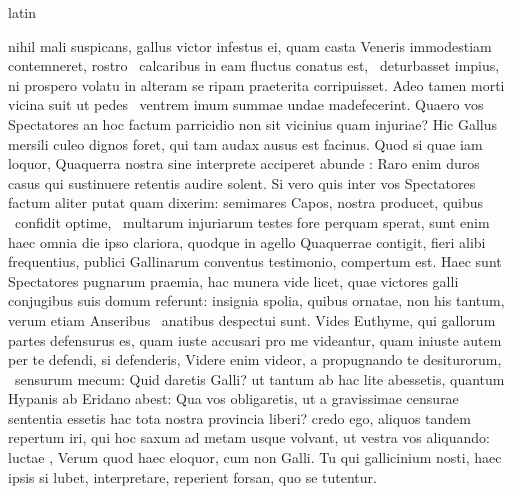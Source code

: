 \documentclass[12pt]{book}
\renewenvironment{latin}
    	{\begin{hyphenrules}{latin}}
    	{\end{hyphenrules}}
\begin{document}
\begin{pages}
\begin{latin}
\begin{Leftside}
                    nihil mali suspicans, gallus victor infestus ei, quam casta Veneris immodestiam contemneret, rostro  \ampersand\ calcaribus in  eam fluctus  conatus est,  \ampersand\ deturbasset impius, 
                    ni prospero volatu in alteram se ripam praeterita corripuisset. 
                    Adeo tamen morti vicina suit ut pedes  \ampersand\ ventrem imum summae undae madefecerint. 
                    Quaero vos Spectatores an hoc factum parricidio non sit vicinius quam injuriae? 
                    Hic Gallus mersili culeo dignos foret, qui tam audax ausus est facinus. 
                    Quod si quae iam loquor, Quaquerra nostra sine   interprete acciperet abunde : 
                    Raro enim duros casus qui sustinuere retentis  audire solent. 
                    Si vero quis inter vos Spectatores factum aliter putat quam dixerim: 
                    semimares Capos,  nostra producet, quibus  \ampersand\ confidit optime,  \ampersand\ multarum injuriarum testes fore perquam sperat, sunt enim haec omnia die ipso clariora, quodque in agello Quaquerrae contigit, fieri alibi frequentius, publici Gallinarum conventus testimonio, compertum est. 
                    Haec sunt Spectatores pugnarum praemia, hac munera vide licet, quae victores galli conjugibus suis domum referunt: 
                     insignia spolia, quibus ornatae, non his tantum, verum etiam Anseribus  \ampersand\ anatibus despectui sunt. 
                    Vides Euthyme, qui gallorum partes defensurus es, quam iuste accusari pro me videantur, quam iniuste autem per te defendi, si defenderis, Videre enim videor, a propugnando te desiturorum,  \ampersand\ sensurum mecum: 
                    Quid daretis Galli? 
                    ut tantum ab hac lite abessetis, quantum Hypanis ab Eridano abest: 
                    Qua  vos obligaretis, ut a gravissimae censurae sententia essetis hac tota nostra provincia liberi? 
                    credo ego, aliquos tandem repertum iri, qui hoc saxum ad metam usque volvant, ut vestra vos aliquando: 
                    luctae , Verum quod haec eloquor, cum non  Galli.
                    Tu  qui gallicinium nosti, haec ipsis si lubet, interpretare, reperient forsan, quo se tutentur. 

\end{Leftside}
\end{latin}
\end{pages}
\end{document}
